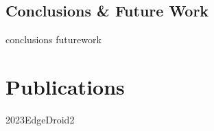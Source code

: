 \documentclass[electronic,oldfontcommands]{kthesis}
\begin{document}
\chapter{Conclusions \& Future Work}\label{chap:conclusions}
{conclusions}
{futurework}

\renewcommand\chaptername{\newchaptername}
\renewcommand*{\thechapter}{\Alph{chapter}}
\part{Publications}\label{part:publications}






{2023EdgeDroid2}

\backmatter%
%
\printglossary[type=\acronymtype]%

\end{document}
